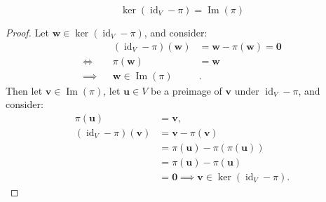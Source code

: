 \documentclass[11pt]{article}
\newcommand{\vect}[1]{\bm{#1}}      %
\DeclareMathOperator{\Img}{Im}
\DeclareMathOperator{\id}{id}
\theoremstyle{definition}
\theoremstyle{plain}
\theoremstyle{remark}
\begin{document}
\begin{enumerate}
\begin{enumerate}
                    \[
                        \ker(\id_V - \pi) = \Img(\pi)
                    \]
                    \begin{proof}
                        Let $\vect{w} \in \ker(\id_V - \pi)$, and consider:
                        \[
                            \begin{alignedat}{2}
                                         &  & (\id_V - \pi)(\vect{w}) & = \vect{w} - \pi(\vect{w}) = \vect{0} \\
                                \iff     &  & \pi(\vect{w})           & = \vect{w}                            \\
                                \implies &  & \vect{w} \in \Img(\pi)  & .
                            \end{alignedat}
                        \]
                        Then let $\vect{v} \in \Img(\pi)$, let $\vect{u} \in V$ be a preimage of $\vect{v}$ under $\id_V - \pi$, and consider:
                        \[
                            \begin{aligned}
                                \pi(\vect{u})           & = \vect{v},                                         \\
                                (\id_V - \pi)(\vect{v}) & = \vect{v} - \pi(\vect{v})                          \\
                                                        & = \pi(\vect{u}) - \pi(\pi(\vect{u}))                \\
                                                        & = \pi(\vect{u}) - \pi(\vect{u})                     \\
                                                        & = \vect{0} \implies \vect{v} \in \ker(\id_V - \pi).
                            \end{aligned}
                        \]
                    \end{proof}
          \end{enumerate}


\end{enumerate}
\end{document}
